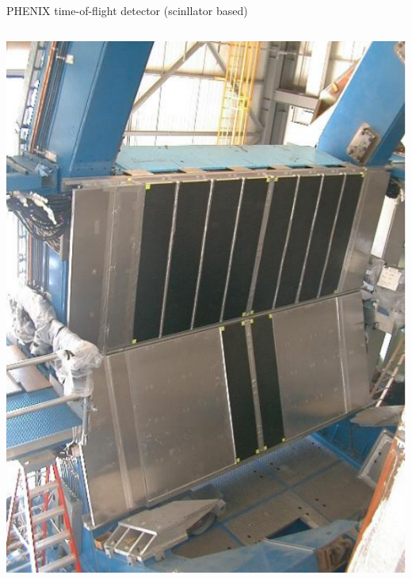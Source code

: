 \documentclass{beamer}
\begin{document}
\begin{frame}{PHENIX time-of-flight detector (scinllator based)}
\begin{columns}
\begin{column}{.5\textwidth}
    \includegraphics[width=\textwidth]{plots/PHENIX_TOF_panel.pdf}
  \end{column}
\end{columns}
\end{frame}
\end{document}
